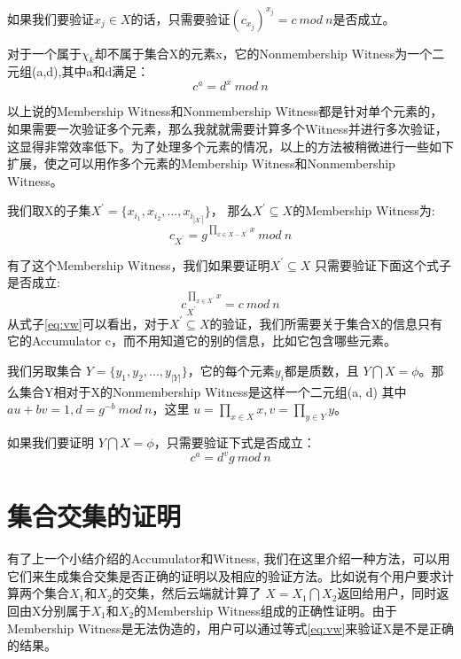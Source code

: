 如果我们要验证$x_j \in X$的话，只需要验证$(c_{x_j})^{x_j} = c\ mod\ n$是否成立。

对于一个属于$\chi_k$却不属于集合X的元素x，它的Nonmembership Witness为一个二元组(a,d),其中a和d满足：
\begin{equation} c^a = d^x\ mod\ n\end{equation}

以上说的Membership Witness和Nonmembership Witness都是针对单个元素的，如果需要一次验证多个元素，那么我就就需要计算多个Witness并进行多次验证，这显得非常效率低下。为了处理多个元素的情况，以上的方法被稍微进行一些如下扩展，使之可以用作多个元素的Membership Witness和Nonmembership Witness。

我们取X的子集$X^{\prime} = \{x_{i_1}, x_{i_2}, ... , x_{i_{|X^\prime|}}\}$， 那么$X^\prime \subseteq X$的Membership Witness为:
\begin{equation} \label{eq:w} c_{X^\prime} = g^{\prod_{x \in X - X^\prime} x}\ mod\ n \end{equation}

有了这个Membership Witness，我们如果要证明$X^\prime \subseteq X$ 只需要验证下面这个式子是否成立:
\begin{equation} \label{eq:vw} c_{X^\prime}^{\prod_{x \in X^\prime} x} = c\ mod\ n\end{equation}
从式子\ref{eq:vw}可以看出，对于$X^\prime \subseteq X$的验证，我们所需要关于集合X的信息只有它的Accumulator c，而不用知道它的别的信息，比如它包含哪些元素。

我们另取集合 $Y = \{y_1, y_2, ... , y_{|Y|}\}$，它的每个元素$y_i$都是质数，且 $Y \bigcap X = \phi$。那么集合Y相对于X的Nonmembership Witness是这样一个二元组(a, d) 其中
$au + bv = 1, d = g^{-b}\ mod\ n$，这里 $u = \prod_{x \in X} x, v = \prod_{y \in Y} y$。

如果我们要证明 $Y \bigcap X = \phi$，只需要验证下式是否成立：
\begin{equation} \label{eq:vnw} c^a = d^v g\ mod\ n \end{equation}

\section{集合交集的证明}
有了上一个小结介绍的Accumulator和Witness, 我们在这里介绍一种方法，可以用它们来生成集合交集是否正确的证明以及相应的验证方法。比如说有个用户要求计算两个集合$X_1$和$X_2$的交集，然后云端就计算了 $X = X_1 \bigcap X_2$返回给用户，同时返回由X分别属于$X_1$和$X_2$的Membership Witness组成的正确性证明。由于Membership Witness是无法伪造的，用户可以通过等式\ref{eq:vw}来验证X是不是正确的结果。


